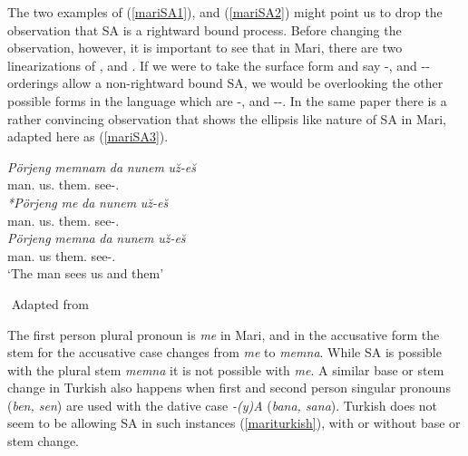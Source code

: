 The two examples of (\ref{mariSA1}), and (\ref{mariSA2}) might point us to drop the observation that SA is a rightward bound process. Before changing the observation, however, it is important to see that in Mari, there are two linearizations of {\Poss}, {\Pl} and {\Lcase}. If we were to take the surface form and say {\Lcase}-{\Poss}, and {\Pl}-{\Lcase}-{\Poss} orderings allow a non-rightward bound SA, we would be overlooking the other possible forms in the language which are {\Poss}-{\Lcase}, and {\Poss}-{\Pl}-{\Lcase}. In the same paper there is a rather convincing observation that shows the ellipsis like nature of SA in Mari, adapted here as (\ref{mariSA3}).

\begin{exe}
 \ex \label{mariSA3}
    \begin{xlist}
        \ex \label{mariSA3a}
        \gll 
        \textit{Pörjeng} \textit{memnam} \textit{da} \textit{nunem} \textit{u\u{z}-e\u{s}} \\ man.{\Nom} us.{\Acc} {\And} them.{\Acc} see-{\Third}{\Sg}.{\Prs} \\
        
        \ex \label{mariSA3c}
        \gll 
        \textit{*Pörjeng} \textit{me} \textit{da} \textit{nunem} \textit{u\u{z}-e\u{s}} \\ man.{\Nom} us.{\Acc} {\And} them.{\Acc} see-{\Third}{\Sg}.{\Prs} \\
        
        \ex \label{mariSA3b} 
        \gll
        \textit{Pörjeng} \textit{memna} \textit{da} \textit{nunem} \textit{u\u{z}-e\u{s}} \\ man.{\Nom} us {\And} them.{\Acc} see-{\Third}{\Sg}.{\Prs} \\
        \glt `The man sees us and them'
    \end{xlist}
    ${}$ \hfill Adapted from \cite{guseva2017postsyntactic}
\end{exe}

The first person plural pronoun is \textit{me} in Mari, and in the accusative form the stem for the accusative case changes from \textit{me} to \textit{memna}. While SA is possible with the plural stem \textit{memna} it is not possible with \textit{me}. A similar base or stem change in Turkish also happens when first and second person singular pronouns (\textit{ben, sen}) are used with the dative case \textit{-(y)A} (\textit{bana, sana}). Turkish does not seem to be allowing SA in such instances (\ref{mariturkish}), with or without base or stem change.

